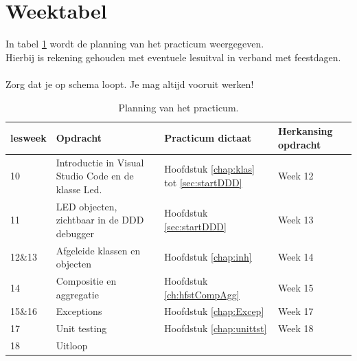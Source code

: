 \chapter*{Weektabel}

In tabel \ref{tabel:wkplan} wordt de planning van het practicum weergegeven.\\
Hierbij is rekening gehouden met eventuele lesuitval in verband met feestdagen.\\~\\
Zorg dat je op schema loopt. Je mag altijd vooruit werken!
\begin{table}[h!]
	\begin{tabular}{ | m{1.5cm} | m{7cm} |p{2.6cm}|p{3cm}| } 
		\hline
lesweek &Opdracht & Practicum dictaat &Herkansing opdracht \\ \hline
	10	& Introductie in Visual Studio Code en de klasse Led. & Hoofdstuk \ref{chap:klas} tot \ref{sec:startDDD}& Week 12\\ \hline
	11	&   LED objecten, zichtbaar in de DDD debugger &  Hoofdstuk \ref{sec:startDDD}&Week 13 \\ \hline
	12\&13	&  Afgeleide klassen en objecten & Hoofdstuk \ref{chap:inh} &Week 14\\ \hline
	14	&Compositie en aggregatie    & Hoofdstuk \ref{ch:hfstCompAgg}&Week 15 \\ \hline
	15\&16	& Exceptions   & Hoofdstuk \ref{chap:Excep}& Week 17 \\ \hline
	17	&Unit testing  & Hoofdstuk \ref{chap:unittst} & Week 18\\ \hline	
	18 &Uitloop& &\\ \hline
	\end{tabular}  
    \caption{Planning van het practicum.}
    \label{tabel:wkplan}
\end{table}

